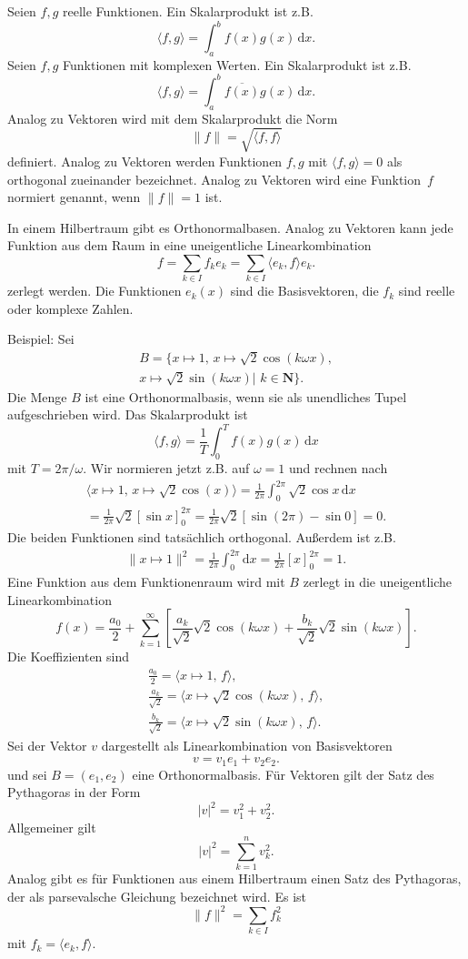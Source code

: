 \documentclass[a4paper,10pt,fleqn,twocolumn,twoside]{article}
\begin{document}
Seien \(f,g\) reelle Funktionen. Ein Skalarprodukt ist z.B.
\[\langle f,g\rangle = \int_a^b f(x)g(x)\,\mathrm dx.\]
Seien \(f,g\) Funktionen mit komplexen Werten.
Ein Skalarprodukt ist z.B.
\[\langle f,g\rangle = \int_a^b \overline{f(x)}g(x)\,\mathrm dx.\]
Analog zu Vektoren wird mit dem Skalarprodukt die Norm
\[\|f\| = \sqrt{\langle f,f\rangle}\]
definiert. Analog zu Vektoren werden Funktionen \(f,g\) mit
\(\langle f,g\rangle=0\) als orthogonal zueinander bezeichnet.
Analog zu Vektoren wird eine Funktion~\(f\) normiert genannt,
wenn \(\|f\|=1\) ist.

In einem Hilbertraum gibt es Orthonormalbasen. Analog zu Vektoren
kann jede Funktion aus dem Raum in eine uneigentliche
Linearkombination
\[f = \sum_{k\in I} f_ke_k = \sum_{k\in I} \langle e_k,f\rangle e_k.\]
zerlegt werden. Die Funktionen \(e_k(x)\) sind die Basisvektoren,
die \(f_k\) sind reelle oder komplexe Zahlen.

Beispiel: Sei
\begin{gather*}
B=\{x\mapsto 1,\,x\mapsto\sqrt{2}\cos(k\omega x),\\
x\mapsto\sqrt{2}\sin(k\omega x)|\,\,k\in\mathbf N\}.
\end{gather*}
Die Menge \(B\) ist eine Orthonormalbasis, wenn sie als unendliches
Tupel aufgeschrieben wird. Das Skalarprodukt ist
\[\langle f,g\rangle = \frac{1}{T}\int_0^T f(x)g(x)\,\mathrm dx\]
mit \(T=2\pi/\omega\). Wir normieren jetzt z.B. auf \(\omega=1\) und
rechnen nach
\begin{gather*}
\langle x\mapsto 1,\,x\mapsto\sqrt{2}\cos(x)\rangle
= \frac{1}{2\pi}\int_0^{2\pi} \sqrt{2}\cos x\,\mathrm dx\\
= \frac{1}{2\pi}\sqrt{2}[\sin x]_0^{2\pi}
= \frac{1}{2\pi}\sqrt{2}[\sin(2\pi)-\sin 0] = 0.
\end{gather*}
Die beiden Funktionen sind tatsächlich orthogonal. Außerdem ist z.B.
\begin{gather*}
\|x\mapsto 1\|^2= \frac{1}{2\pi}\int_0^{2\pi} \mathrm dx
= \frac{1}{2\pi}[x]_0^{2\pi}=1.
\end{gather*}
Eine Funktion aus dem Funktionenraum wird mit \(B\) zerlegt in die
uneigentliche Linearkombination
\[f(x) = \frac{a_0}{2}+\sum_{k=1}^\infty
[\frac{a_k}{\sqrt{2}}\sqrt{2}\cos(k\omega x)
+\frac{b_k}{\sqrt{2}}\sqrt{2}\sin(k\omega x)].\]
Die Koeffizienten sind
\begin{gather*}
\frac{a_0}{2}
= \langle x\mapsto 1,\,f\rangle,\\
\frac{a_k}{\sqrt{2}}
= \langle x\mapsto \sqrt{2}\cos(k\omega x),\,f\rangle,\\
\frac{b_k}{\sqrt{2}}
= \langle x\mapsto \sqrt{2}\sin(k\omega x),\,f\rangle.
\end{gather*}
%
Sei der Vektor \(v\) dargestellt als Linearkombination von
Basisvektoren
\[v = v_1e_1+v_2e_2.\]
und sei \(B=(e_1,e_2)\) eine Orthonormalbasis.
Für Vektoren gilt der Satz des Pythagoras in der Form
\[|v|^2 = v_1^2+v_2^2.\]
Allgemeiner gilt
\[|v|^2 = \sum_{k=1}^n v_k^2.\]
Analog gibt es für Funktionen aus einem Hilbertraum einen Satz des
Pythagoras, der als
parsevalsche Gleichung bezeichnet wird. Es ist
\[\|f\|^2 = \sum_{k\in I} f_k^2\]
mit \(f_k=\langle e_k,f\rangle\).
\end{document}

